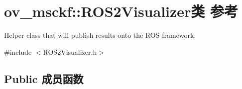 \hypertarget{classov__msckf_1_1ROS2Visualizer}{}\section{ov\+\_\+msckf\+:\+:R\+O\+S2\+Visualizer类 参考}
\label{classov__msckf_1_1ROS2Visualizer}


Helper class that will publish results onto the R\+OS framework.  




{\ttfamily \#include $<$R\+O\+S2\+Visualizer.\+h$>$}

\subsection*{Public 成员函数}
